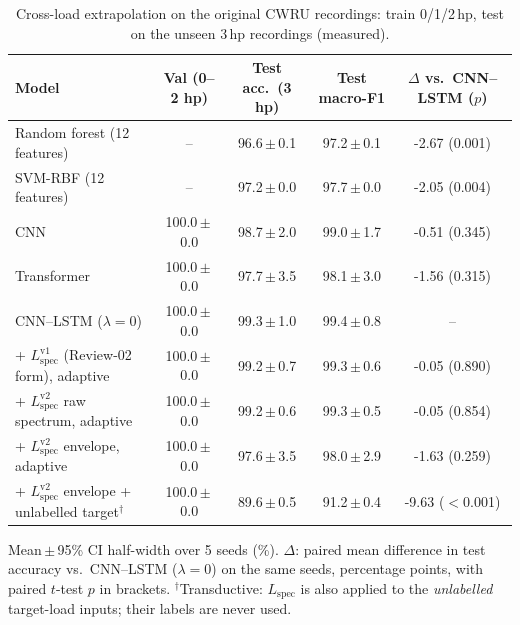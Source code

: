 \begin{table}[t]
\caption{Cross-load extrapolation on the original CWRU recordings: train 0/1/2\,hp, test on the unseen 3\,hp recordings (measured).}
\label{tab:xload}
\centering
\footnotesize
\begin{tabular}{lcccc}
\toprule
Model & Val (0--2 hp) & Test acc.\ (3 hp) & Test macro-F1 & $\Delta$ vs.\ CNN--LSTM ($p$) \\
\midrule
Random forest (12 features) & -- & 96.6\,$\pm$\,0.1 & 97.2\,$\pm$\,0.1 & -2.67 (0.001) \\
SVM-RBF (12 features) & -- & 97.2\,$\pm$\,0.0 & 97.7\,$\pm$\,0.0 & -2.05 (0.004) \\
CNN & 100.0\,$\pm$\,0.0 & 98.7\,$\pm$\,2.0 & 99.0\,$\pm$\,1.7 & -0.51 (0.345) \\
Transformer & 100.0\,$\pm$\,0.0 & 97.7\,$\pm$\,3.5 & 98.1\,$\pm$\,3.0 & -1.56 (0.315) \\
CNN--LSTM ($\lambda=0$) & 100.0\,$\pm$\,0.0 & 99.3\,$\pm$\,1.0 & 99.4\,$\pm$\,0.8 & -- \\
\midrule
+ $L_{\mathrm{spec}}^{\mathrm{v1}}$ (Review-02 form), adaptive & 100.0\,$\pm$\,0.0 & 99.2\,$\pm$\,0.7 & 99.3\,$\pm$\,0.6 & -0.05 (0.890) \\
+ $L_{\mathrm{spec}}^{\mathrm{v2}}$ raw spectrum, adaptive & 100.0\,$\pm$\,0.0 & 99.2\,$\pm$\,0.6 & 99.3\,$\pm$\,0.5 & -0.05 (0.854) \\
+ $L_{\mathrm{spec}}^{\mathrm{v2}}$ envelope, adaptive & 100.0\,$\pm$\,0.0 & 97.6\,$\pm$\,3.5 & 98.0\,$\pm$\,2.9 & -1.63 (0.259) \\
+ $L_{\mathrm{spec}}^{\mathrm{v2}}$ envelope + unlabelled target$^{\dagger}$ & 100.0\,$\pm$\,0.0 & 89.6\,$\pm$\,0.5 & 91.2\,$\pm$\,0.4 & -9.63 ($<$0.001) \\
\bottomrule
\end{tabular}
\par\vspace{2pt}\parbox{0.95\textwidth}{\scriptsize Mean\,$\pm$\,95\% CI half-width over 5 seeds (\%). $\Delta$: paired mean difference in test accuracy vs.\ CNN--LSTM ($\lambda=0$) on the same seeds, percentage points, with paired $t$-test $p$ in brackets. $^{\dagger}$Transductive: $L_{\mathrm{spec}}$ is also applied to the \emph{unlabelled} target-load inputs; their labels are never used.}
\end{table}
